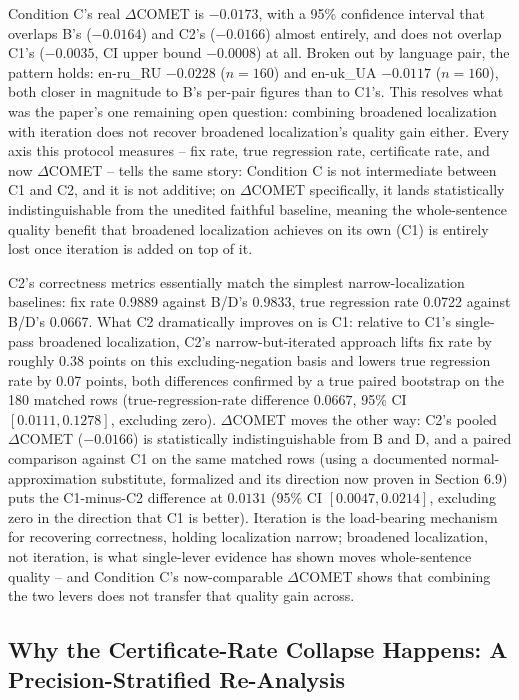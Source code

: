 \documentclass[11pt,letterpaper]{article}
\begin{document}
Condition C's real $\Delta$COMET is $-0.0173$, with a 95\% confidence interval that overlaps B's ($-0.0164$) and C2's ($-0.0166$) almost entirely, and does not overlap C1's ($-0.0035$, CI upper bound $-0.0008$) at all. Broken out by language pair, the pattern holds: en-ru\_RU $-0.0228$ ($n=160$) and en-uk\_UA $-0.0117$ ($n=160$), both closer in magnitude to B's per-pair figures than to C1's. This resolves what was the paper's one remaining open question: combining broadened localization with iteration does not recover broadened localization's quality gain either. Every axis this protocol measures -- fix rate, true regression rate, certificate rate, and now $\Delta$COMET -- tells the same story: Condition C is not intermediate between C1 and C2, and it is not additive; on $\Delta$COMET specifically, it lands statistically indistinguishable from the unedited faithful baseline, meaning the whole-sentence quality benefit that broadened localization achieves on its own (C1) is entirely lost once iteration is added on top of it.

C2's correctness metrics essentially match the simplest narrow-localization baselines: fix rate 0.9889 against B/D's 0.9833, true regression rate 0.0722 against B/D's 0.0667. What C2 dramatically improves on is C1: relative to C1's single-pass broadened localization, C2's narrow-but-iterated approach lifts fix rate by roughly 0.38 points on this excluding-negation basis and lowers true regression rate by 0.07 points, both differences confirmed by a true paired bootstrap on the 180 matched rows (true-regression-rate difference $0.0667$, 95\% CI $[0.0111,0.1278]$, excluding zero). $\Delta$COMET moves the other way: C2's pooled $\Delta$COMET ($-0.0166$) is statistically indistinguishable from B and D, and a paired comparison against C1 on the same matched rows (using a documented normal-approximation substitute, formalized and its direction now proven in Section 6.9) puts the C1-minus-C2 difference at $0.0131$ (95\% CI $[0.0047,0.0214]$, excluding zero in the direction that C1 is better). Iteration is the load-bearing mechanism for recovering correctness, holding localization narrow; broadened localization, not iteration, is what single-lever evidence has shown moves whole-sentence quality -- and Condition C's now-comparable $\Delta$COMET shows that combining the two levers does not transfer that quality gain across.

\subsection{Why the Certificate-Rate Collapse Happens: A Precision-Stratified Re-Analysis}
\end{document}
